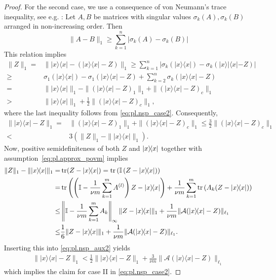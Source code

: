 \begin{proof}
For the second case, we use a consequence of von Neumann's trace inequality, see e.g. \cite[Theorem~7.4.9.1]{Horn_1994_Topics}:
Let $ A,  B$ be matrices with singular values $\sigma_k ( A),\sigma_k ( B)$ arranged in non-increasing order.
Then
\[
  \|  A -  B \|_1 \geq \sum_{k=1}^n | \sigma_k ( A) - \sigma_k ( B)|
\]
This relation implies
\begin{align}
  \|  Z \|_1 =& \| |{x} \rangle \! \langle {x}| - (|{x} \rangle \! \langle {x}|- Z) \|_1
  \geq \sum_{k=1}^n \left| \sigma_k (| x \rangle \! \langle  x|) - \sigma_k (| x \rangle \! |\langle  x|-  Z ) \right| \\
  \geq & \sigma_1 (| x \rangle \langle  x|) - \sigma_1 \left( | x \rangle \! \langle  x| -  Z \right)+ \sum_{k=2}^n \sigma_k \left( | x \rangle \! \langle  x| -  Z\right) \\
  =&  \| | x \rangle \! \langle  x| \|_1  - \| (| x \rangle \! \langle  x| -  Z)_1 \|_1 + \|(| x \rangle \! \langle  x| - Z)_c \|_1 \\
  >& \| | x \rangle \! \langle  x| \|_1 + \frac{1}{2} \| (| x \rangle \! \langle  x|- Z)_c \|_1,
\end{align}
where the last inequality follows from \eqref{eq:pl.nsp_case2}. Consequently,
\begin{align}
  \| | x \rangle \! \langle  x| -  Z \|_1
  =& \| (| x \rangle \! \langle  x| -  Z)_1 \|_1 + \| (| x \rangle \! \langle  x|- Z)_c \|_1
  \leq \frac{3}{2} \| (| x \rangle \! \langle  x|-  Z )_c \|_1 \nonumber \\
  < & 3 \left( \|  Z \|_1 - \| | x \rangle \! \langle  x| \|_1 \right). \label{eq:pl.nsp_aux2}
\end{align}
Now, positive semidefiniteness of both $ Z$ and $\ket{ x}\bra{ x}$ together with assumption~\eqref{eq:pl.approx_povm} implies
\begin{align}
  \|  Z \|_1 - \| |{x} \rangle \! \langle {x}| \|_1
  =& \tr ( Z-|{x} \rangle \! \langle {x}|) =  \tr \left( \mathbb{I} \left(  Z-| {x} \rangle \! \langle x|\right) \right) \\
  =&  \tr \left( \left( \mathbb{I} - \frac{1}{\nu m} \sum_{k=1}^m A\ind{l} \right)  Z-|{x} \rangle \! \langle {x}| \right) + \frac{1}{\nu m} \sum_{k=1}^m \tr \left( A_k ( Z-|{x} \rangle \! \langle {x}|) \right) \\
  \leq &  \left\|\mathbb{I}- \frac{1}{ \nu m} \sum_{k=1}^m A_k \right\|_\infty \|  Z-|{x} \rangle \! \langle {x}| \|_1 + \frac{1}{\nu m} \| \mathcal{A}(|{x} \rangle \! \langle {x}|- Z) \|_{\ell_1} \\
  \leq &  \frac{1}{6 } \|  Z-|{x} \rangle \! \langle {x}| \|_1 + \frac{1}{\nu m} \| \mathcal{A}(|{x} \rangle \! \langle {x}|- Z) \|_{\ell_1}.
\end{align}
Inserting this into \eqref{eq:pl.nsp_aux2} yields
\begin{align}
\| | x \rangle \! \langle  x| -  Z \|_1 < \frac{1}{2} \| |{x} \rangle \! \langle {x}|- Z \|_1 +  \frac{3}{\nu m} \| \mathcal{A}(|{x} \rangle \! \langle {x}|- Z) \|_{\ell_1}
\end{align}
which implies the claim for case II in \eqref{eq:pl.nsp_case2}.
\end{proof}


